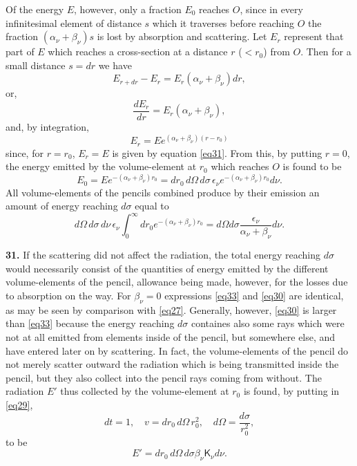 \documentclass[12pt,oneside]{book}
\begin{document}
Of the energy $E$, however, only a fraction $E_0$ reaches $O$, since in every infinitesimal element of distance $s$ which it traverses before reaching $O$ the fraction $(\alpha_\nu+\beta_\nu)s$ is lost by absorption and scattering. Let $E_r$ represent that part of $E$ which reaches a cross-section at a distance $r$ ($<r_0$) from $O$. Then for a small distance $s=dr$ we have
$$E_{r+dr}-E_r=E_r(\alpha_\nu+\beta_\nu)dr,$$
or,
$$\frac{dE_r}{dr}=E_r(\alpha_\nu+\beta_\nu),$$
and, by integration,
$$E_r=Ee^{(\alpha_\nu+\beta_\nu)(r-r_0)}$$
since, for $r=r_0$, $E_r=E$ is given by equation \eqref{eq31}. From this, by putting $r=0$, the energy emitted by the volume-element at $r_0$ which reaches $O$ is found to be
\begin{equation}
    E_0=Ee^{-(\alpha_\nu+\beta_\nu)r_0}=dr_0\, d\Omega\, d\sigma\, \epsilon_\nu e^{-(\alpha_\nu+\beta_\nu)r_0}d\nu.
    \label{eq32}
\end{equation}
All volume-elements of the pencils combined produce by their emission an amount of energy reaching $d\sigma$ equal to
\begin{equation}
    d\Omega\, d\sigma\, d\nu\, \epsilon_\nu\int_0^\infty dr_0e^{-(\alpha_\nu+\beta_\nu)r_0}=d\Omega d\sigma\frac{\epsilon_\nu}{\alpha_\nu+\beta_\nu}d\nu.
    \label{eq33}
\end{equation} \par

\textbf{31.} If the scattering did not affect the radiation, the total energy reaching $d\sigma$ would necessarily consist of the quantities of energy emitted by the different volume-elements of the pencil, allowance being made, however, for the losses due to absorption on the way. For $\beta_\nu=0$ expressions \eqref{eq33} and \eqref{eq30} are identical, as may be seen by comparison with \eqref{eq27}. Generally, however, \eqref{eq30} is larger than \eqref{eq33} because the energy reaching $d\sigma$ containes also some rays which were not at all emitted from elements inside of the pencil, but somewhere else, and have entered later on by scattering. In fact, the volume-elements of the pencil do not merely scatter outward the radiation which is being transmitted inside the pencil, but they also collect into the pencil rays coming from without. The radiation $E'$ thus collected by the volume-element at $r_0$ is found, by putting in \eqref{eq29},
$$dt=1,\quad v=dr_0\, d\Omega\, r_0^2, \quad d\Omega=\frac{d\sigma}{r_0^2},$$
to be
$$E'=dr_0\, d\Omega\, d\sigma \beta_\nu\mathsf{K}_\nu d\nu.$$ \par
\end{document}
